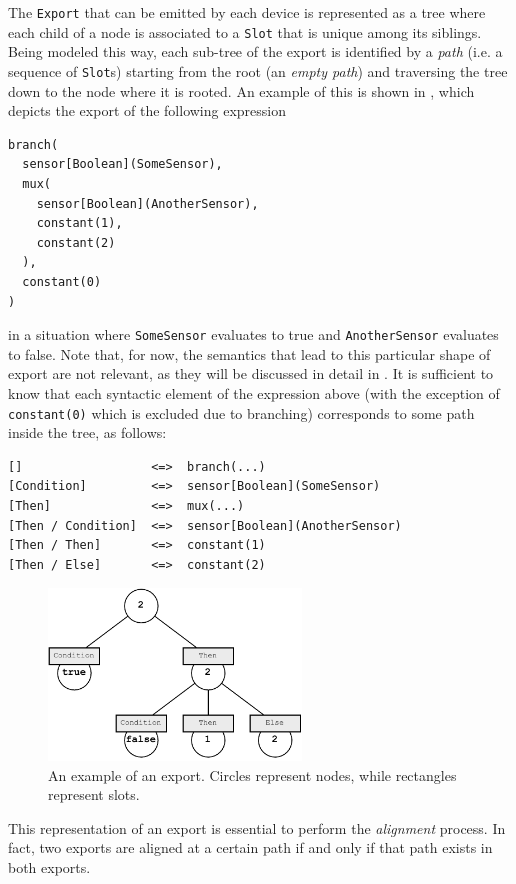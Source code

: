 The \texttt{Export} that can be emitted by each device is represented as a tree where each child of a node is associated to a \texttt{Slot} that is unique among its siblings.
%
Being modeled this way, each sub-tree of the export is identified by a \textit{path} (i.e. a sequence of \texttt{Slot}s) starting from the root (an \textit{empty path}) and traversing the tree down to the node where it is rooted.
%
An example of this is shown in , which depicts the export of the following expression
%
\begin{lstlisting}[frame=single]
branch(
  sensor[Boolean](SomeSensor),
  mux(
    sensor[Boolean](AnotherSensor),
    constant(1),
    constant(2)
  ),
  constant(0)
)
\end{lstlisting}
%
in a situation where \texttt{SomeSensor} evaluates to true and \texttt{AnotherSensor} evaluates to false.
%
Note that, for now, the semantics that lead to this particular shape of export are not relevant, as they will be discussed in detail in .
%
It is sufficient to know that each syntactic element of the expression above (with the exception of \texttt{constant(0)} which is excluded due to branching) corresponds to some path inside the tree, as follows:
%
\begin{verbatim}
[]                  <=>  branch(...)
[Condition]         <=>  sensor[Boolean](SomeSensor)
[Then]              <=>  mux(...)
[Then / Condition]  <=>  sensor[Boolean](AnotherSensor)
[Then / Then]       <=>  constant(1)
[Then / Else]       <=>  constant(2)
\end{verbatim}
%
\begin{figure}
    \centering
    \includegraphics[width=0.6\textwidth]{figures/export-example.pdf}
    \caption{An example of an export. Circles represent nodes, while rectangles represent slots.}
    \label{fig:export-example}
\end{figure}
%
This representation of an export is essential to perform the \textit{alignment} process.
%
In fact, two exports are aligned at a certain path if and only if that path exists in both exports.

